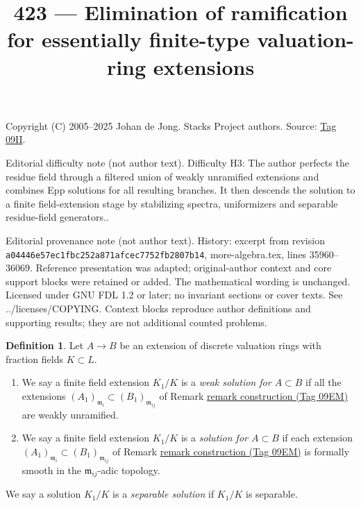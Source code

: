 \documentclass{amsart}
\theoremstyle{plain}
\theoremstyle{definition}
\newtheorem{definition}[subsection]{Definition}
\theoremstyle{remark}
\numberwithin{equation}{subsection}
\begin{document}
\title[Stacks Project, Tag 09II]{423 --- Elimination of ramification for essentially finite-type valuation-ring extensions}
\maketitle
\noindent Copyright (C) 2005--2025 Johan de Jong. Stacks Project authors. Source: \href{https://stacks.math.columbia.edu/tag/09II}{Tag 09II}.

\noindent Editorial difficulty note (not author text). Difficulty H3: The author perfects the residue field through a filtered union of weakly unramified extensions and combines Epp solutions for all resulting branches. It then descends the solution to a finite field-extension stage by stabilizing spectra, uniformizers and separable residue-field generators..

\noindent Editorial provenance note (not author text). History: excerpt from revision \texttt{a0444\allowbreak 6e57e\allowbreak c1fbc\allowbreak 252a8\allowbreak 71afc\allowbreak ec775\allowbreak 2fb28\allowbreak 07b14}, more-algebra.tex, lines 35960--36069. Reference presentation was adapted; original-author context and core support blocks were retained or added. The mathematical wording is unchanged. Licensed under GNU FDL 1.2 or later; no invariant sections or cover texts. See ../licenses/COPYING. Context blocks reproduce author definitions and supporting results; they are not additional counted problems.

\begin{definition}
\label{definition-solution}
Let $A \to B$ be an extension of discrete valuation rings with fraction
fields $K \subset L$.
\begin{enumerate}
\item We say a finite field extension $K_1/K$ is a
{\it weak solution for $A \subset B$} if all the extensions
$(A_1)_{\mathfrak m_i} \subset (B_1)_{\mathfrak m_{ij}}$ of
Remark \href{https://stacks.math.columbia.edu/tag/09EM}{remark construction (Tag 09EM)} are weakly unramified.
\item We say a finite field extension $K_1/K$ is a
{\it solution for $A \subset B$} if each extension
$(A_1)_{\mathfrak m_i} \subset (B_1)_{\mathfrak m_{ij}}$ of
Remark \href{https://stacks.math.columbia.edu/tag/09EM}{remark construction (Tag 09EM)} is formally smooth in
the $\mathfrak m_{ij}$-adic topology.
\end{enumerate}
We say a solution $K_1/K$ is a {\it separable solution}
if $K_1/K$ is separable.
\end{definition}
\end{document}
